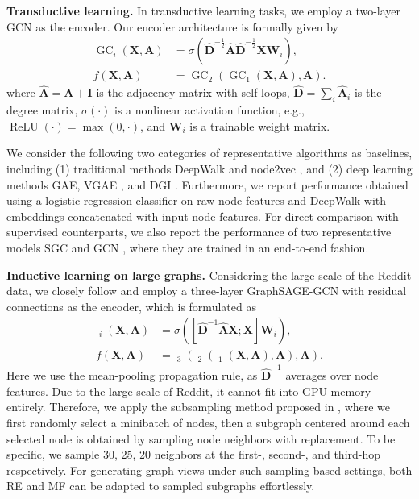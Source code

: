 \documentclass{article}
\theoremstyle{remark}
\DeclareMathOperator{\GC}{GC}
\DeclareMathOperator{\MP}{\widehat{MP}}
\begin{document}
\textbf{Transductive learning.\quad}
In transductive learning tasks, we employ a two-layer GCN \cite{Kipf:2016tc} as the encoder. Our encoder architecture is formally given by
\begin{align}
	\GC_i (\bm{X}, \bm{A}) & = \sigma \left( \hat{\bm{D}}^{-\frac{1}{2}} \hat {\bm{A}} \hat{\bm{D}}^{-\frac{1}{2}} \bm{X} \bm{W}_i \right), \\
	f(\bm X, \bm A) & = \GC_2 ( \GC_1 ( \bm{X}, \bm{A} ), \bm{A} ).
\end{align}
where \(\hat{\bm{A}} = \bm{A} + \bm{I}\) is the adjacency matrix with self-loops, \(\hat {\bm D} = \sum_i \hat{\bm{A}}_i\) is the degree matrix, \(\sigma(\cdot)\) is a nonlinear activation function, e.g., \(\operatorname{ReLU}(\cdot) = \max(0, \cdot)\), and \(\bm{W}_i\) is a trainable weight matrix.

We consider the following two categories of representative algorithms as baselines, including (1) traditional methods DeepWalk \cite{Perozzi:2014ib} and node2vec \cite{Grover:2016ex}, and (2) deep learning methods GAE, VGAE \cite{Kipf:2016ul}, and DGI \cite{Velickovic:2019tu}. Furthermore, we report performance obtained using a logistic regression classifier on raw node features and DeepWalk with embeddings concatenated with input node features. For direct comparison with supervised counterparts, we also report the performance of two representative models SGC \cite{Wu:2019vz} and GCN \cite{Kipf:2016tc}, where they are trained in an end-to-end fashion.

\textbf{Inductive learning on large graphs.\quad}
Considering the large scale of the Reddit data, we closely follow \cite{Velickovic:2019tu} and employ a three-layer GraphSAGE-GCN \cite{Hamilton:2017tp} with residual connections \cite{He:2016ib} as the encoder, which is formulated as
\begin{align}
	\MP_i(\bm{X}, \bm{A}) & = \sigma( [\hat{\bm{D}}^{-1}\hat{\bm{A}}\bm{X} ; \bm{X}] \bm{W}_i ),\label{eq:SAGE-mean-pooling}\\
	f(\bm{X}, \bm{A}) & = \MP_3 ( \MP_2 ( \MP_1 ( \bm{X}, \bm{A} ) , \bm{A} ), \bm{A} ).
\end{align}
Here we use the mean-pooling propagation rule, as \(\hat{\bm{D}}^{-1}\) averages over node features. Due to the large scale of Reddit, it cannot fit into GPU memory entirely. Therefore, we apply the subsampling method proposed in \cite{Hamilton:2017tp}, where we first randomly select a minibatch of nodes, then a subgraph centered around each selected node is obtained by sampling node neighbors with replacement. To be specific, we sample 30, 25, 20 neighbors at the first-, second-, and third-hop respectively. For generating graph views under such sampling-based settings, both RE and MF can be adapted to sampled subgraphs effortlessly.
\end{document}
